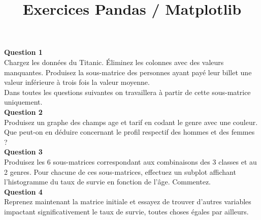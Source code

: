 \documentclass[a4paper]{article}
\title{Exercices Pandas / Matplotlib}
\date{}
\begin{document}
\maketitle

\textbf{Question 1}\\

Chargez les données du Titanic. {\'E}liminez les colonnes avec des valeurs manquantes. Produisez la sous-matrice des personnes ayant payé leur billet une valeur inférieure à trois fois la valeur moyenne.\\

Dans toutes les questions suivantes on travaillera à partir de cette sous-matrice uniquement.\\

\textbf{Question 2}\\

Produisez un graphe des champs age et tarif en codant le genre avec une couleur. Que peut-on en déduire concernant le profil respectif des hommes et des femmes ?\\

\textbf{Question 3}\\

Produisez les 6 sous-matrices correspondant aux combinaisons des 3 classes et au 2 genres. Pour chacune de ces sous-matrices, effectuez un subplot affichant l'histogramme du taux de survie en fonction de l'âge. Commentez.\\

\textbf{Question 4}\\

Reprenez maintenant la matrice initiale et essayez de trouver d'autres variables impactant significativement le taux de survie, toutes choses égales par ailleurs.
\end{document}
